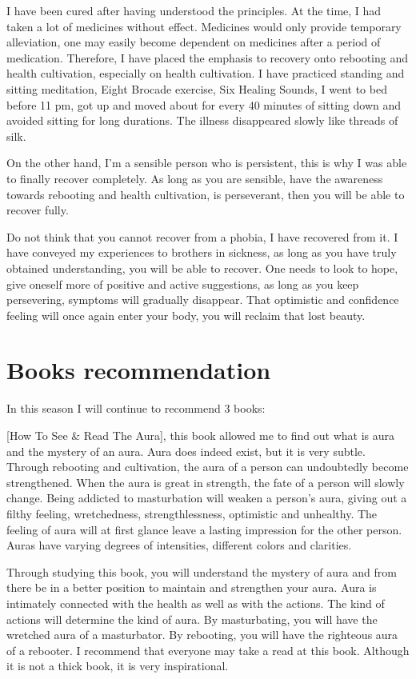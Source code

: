 \documentclass[
]{book}
\begin{document}
I have been cured after having understood the principles. At the time, I had taken a lot of medicines without effect. Medicines would only provide temporary alleviation, one may easily become dependent on medicines after a period of medication. Therefore, I have placed the emphasis to recovery onto rebooting and health cultivation, especially on health cultivation. I have practiced standing and sitting meditation, Eight Brocade exercise, Six Healing Sounds, I went to bed before 11 pm, got up and moved about for every 40 minutes of sitting down and avoided sitting for long durations. The illness disappeared slowly like threads of silk.

On the other hand, I'm a sensible person who is persistent, this is why I was able to finally recover completely. As long as you are sensible, have the awareness towards rebooting and health cultivation, is perseverant, then you will be able to recover fully.

Do not think that you cannot recover from a phobia, I have recovered from it. I have conveyed my experiences to brothers in sickness, as long as you have truly obtained understanding, you will be able to recover. One needs to look to hope, give oneself more of positive and active suggestions, as long as you keep persevering, symptoms will gradually disappear. That optimistic and confidence feeling will once again enter your body, you will reclaim that lost beauty.

\hypertarget{books-recommendation-5}{%
\section{Books recommendation}\label{books-recommendation-5}}

In this season I will continue to recommend 3 books:

{[}How To See \& Read The Aura{]}, this book allowed me to find out what is aura and the mystery of an aura. Aura does indeed exist, but it is very subtle. Through rebooting and cultivation, the aura of a person can undoubtedly become strengthened. When the aura is great in strength, the fate of a person will slowly change. Being addicted to masturbation will weaken a person's aura, giving out a filthy feeling, wretchedness, strengthlessness, optimistic and unhealthy. The feeling of aura will at first glance leave a lasting impression for the other person. Auras have varying degrees of intensities, different colors and clarities.

Through studying this book, you will understand the mystery of aura and from there be in a better position to maintain and strengthen your aura. Aura is intimately connected with the health as well as with the actions. The kind of actions will determine the kind of aura. By masturbating, you will have the wretched aura of a masturbator. By rebooting, you will have the righteous aura of a rebooter. I recommend that everyone may take a read at this book. Although it is not a thick book, it is very inspirational.
\end{document}
